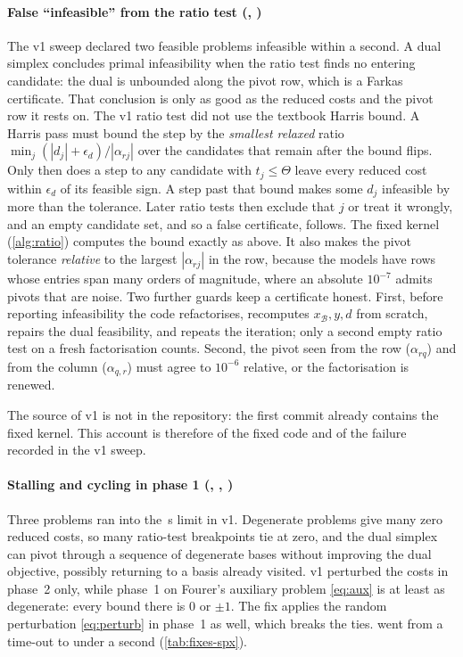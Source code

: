 \paragraph{False ``infeasible'' from the ratio test (, )}
The v1 sweep declared two feasible problems infeasible within a second. A dual simplex concludes
primal infeasibility when the ratio test finds no entering candidate: the dual is unbounded along the
pivot row, which is a Farkas certificate. That conclusion is only as good as the reduced costs and the
pivot row it rests on. The v1 ratio test did not use the textbook Harris bound. A Harris pass must
bound the step by the \emph{smallest relaxed} ratio $\min_j(|d_j|+\epsilon_d)/|\alpha_{rj}|$ over the
candidates that remain after the bound flips. Only then does a step to any candidate with $t_j\le\Theta$
leave every reduced cost within $\epsilon_d$ of its feasible sign. A step past that bound makes some
$d_j$ infeasible by more than the tolerance. Later ratio tests then exclude that $j$ or treat it
wrongly, and an empty candidate set, and so a false certificate, follows. The fixed kernel
(\cref{alg:ratio}) computes the bound exactly as above. It also makes the pivot tolerance
\emph{relative} to the largest $|\alpha_{rj}|$ in the row, because the  models have rows
whose entries span many orders of magnitude, where an absolute $10^{-7}$ admits pivots that are noise.
Two further guards keep a certificate honest. First, before reporting infeasibility the code
refactorises, recomputes $x_{\mathcal B},y,d$ from scratch, repairs the dual feasibility, and repeats the
iteration; only a second empty ratio test on a fresh factorisation counts. Second, the pivot seen
from the row ($\alpha_{rq}$) and from the column ($\alpha_{q,r}$) must agree to $10^{-6}$ relative, or
the factorisation is renewed.

The source of v1 is not in the repository: the first commit already contains the fixed kernel. This
account is therefore of the fixed code and of the failure recorded in the v1 sweep.

\paragraph{Stalling and cycling in phase 1 (, , )}
Three problems ran into the \tlNetlib\,s limit in v1. Degenerate problems give many zero
reduced costs, so many ratio-test breakpoints tie at zero, and the dual simplex can pivot through a
sequence of degenerate bases without improving the dual objective, possibly returning to a basis
already visited. v1 perturbed the costs in phase~2 only, while phase~1 on Fourer's auxiliary problem
\eqref{eq:aux} is at least as degenerate: every bound there is $0$ or $\pm1$. The fix applies the
random perturbation \eqref{eq:perturb} in phase~1 as well, which breaks the ties. 
went from a time-out to under a second (\cref{tab:fixes-spx}).

